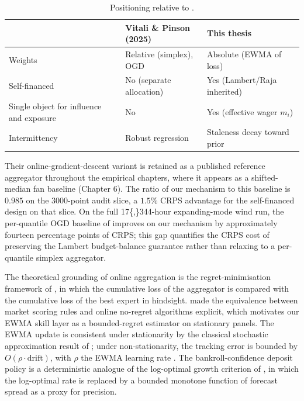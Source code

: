 \documentclass[
  11pt,
  a4paper,
  oneside]{report}
\begin{document}
\begin{table}[h]
\centering
\small
\begin{tabular}{lll}
\toprule
& Vitali \& Pinson (2025) & This thesis \\
\midrule
Weights & Relative (simplex), OGD & Absolute (EWMA of loss) \\
Self-financed & No (separate allocation) & Yes (Lambert/Raja inherited) \\
Single object for influence and exposure & No & Yes (effective wager $m_i$) \\
Intermittency & Robust regression & Staleness decay toward prior \\
\bottomrule
\end{tabular}
\caption{Positioning relative to \citet{vitali2025intermittent}.}
\label{tab:vitali-diff}
\end{table}

Their online-gradient-descent variant is retained as a published
reference aggregator throughout the empirical chapters, where it appears
as a shifted-median fan baseline (Chapter 6). The ratio of our mechanism
to this baseline is \(0.985\) on the 3000-point audit slice, a \(1.5\%\)
CRPS advantage for the self-financed design on that slice. On the full
17\{,\}344-hour expanding-mode wind run, the per-quantile OGD baseline
of \citet{vitali2025intermittent} improves on our mechanism by
approximately fourteen percentage points of CRPS; this gap quantifies the
CRPS cost of preserving the Lambert budget-balance guarantee rather than
relaxing to a per-quantile simplex aggregator.

The theoretical grounding of online aggregation is the
regret-minimisation framework of \citet{cesabianchi2006prediction}, in
which the cumulative loss of the aggregator is compared with the
cumulative loss of the best expert in hindsight. \citet{chen2010new}
made the equivalence between market scoring rules and online no-regret
algorithms explicit, which motivates our EWMA skill layer as a
bounded-regret estimator on stationary panels. The EWMA update is
consistent under stationarity by the classical stochastic approximation
result of \citet{robbins1951stochastic}; under non-stationarity, the
tracking error is bounded by \(O(\rho \cdot \mathrm{drift})\), with
\(\rho\) the EWMA learning rate \citep{benveniste1990adaptive}. The
bankroll-confidence deposit policy is a deterministic analogue of the
log-optimal growth criterion of \citet{kelly1956new}, in which the
log-optimal rate is replaced by a bounded monotone function of forecast
spread as a proxy for precision.
\end{document}
